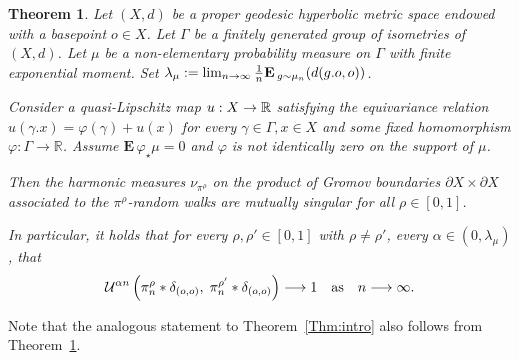 \documentclass[10pt]{amsart}
\newtheorem{theo}{Theorem}[section]
\theoremstyle{definition}\newtheorem{defi}[theo]{Definition}\newtheorem{rema}[theo]{Remark}\newtheorem{exam}[theo]{Example}\newtheorem{exem}[theo]{Example}\newtheorem{nota}[theo]{Notation}
\newcommand{\f}{\varphi}
\newcommand{\cU}{\mathcal{U}}
\newcommand{\R}{\mathbb{R}}
\newcommand{\Eb}{\mathbf{E}\,}
\renewcommand{\(}{\left(}
\renewcommand{\)}{\right)}
\renewcommand*{\to}{\mathchoice{\longrightarrow}{\rightarrow}{\rightarrow}{\rightarrow}}
\begin{document}
\begin{theo}\label{Thm:harmonic+}
Let $(X, d)$ be a proper geodesic hyperbolic metric space endowed with a basepoint $o\in X$. Let $\Gamma$ be a finitely generated group of isometries of $(X, d)$. Let $\mu$ be a non-elementary probability measure on $\Gamma$ with finite exponential moment. Set $\lambda_{\mu}:=\lim_{n\to \infty} \frac{1}{n}\Eb_{g \sim \mu_{n}}(d(g.o,o))$.

Consider a quasi-Lipschitz map $u:X \to \R$ satisfying the equivariance relation $u(\gamma.x)=\varphi(\gamma)+u(x)$ for every $\gamma\in \Gamma, x\in X$ and some fixed homomorphism $\f:\Gamma\rightarrow \R$. Assume $\Eb \f_\star\mu=0$ and $\f$ is not identically zero on the support of $\mu$.


Then the harmonic measures $\nu_{\pi^\rho}$ on the product of Gromov boundaries $\partial X\times \partial X$ associated to the $\pi^\rho$-random walks are mutually singular for all $\rho \in [0, 1]$.

In particular, it holds that for every $\rho, \rho' \in [0, 1]$ with $\rho \neq \rho'$, every $\alpha\in (0, \lambda_{\mu})$, that
\[
\cU^{\alpha n}\left(\pi^\rho_{n}*\delta_{(o,o)}, \;\pi^{\rho'}_{n}*\delta_{(o,o)}\right)
\to 1 \quad \text{as}\quad n \to \infty.
\]
\end{theo}


Note that the analogous statement to Theorem~\ref{Thm:intro} also follows from Theorem~\ref{Thm:harmonic+}.
\end{document}
